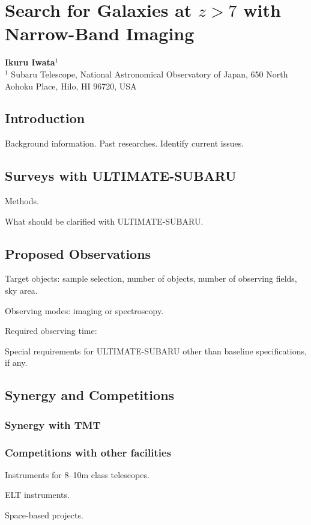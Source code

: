 \section{Search for Galaxies at $z>7$ with Narrow-Band Imaging
\label{sec:nbf}}

\noindent
{\bf Ikuru Iwata$^{1}$}\\
$^1$ Subaru Telescope, National Astronomical Observatory of Japan, 650
North Aohoku Place, Hilo, HI 96720, USA
\vspace{0.5cm}

\subsection{Introduction}

Background information. 
Past researches.
Identify current issues.

\subsection{Surveys with ULTIMATE-SUBARU}

Methods.

What should be clarified with ULTIMATE-SUBARU.

\subsection{Proposed Observations}

Target objects: sample selection, number of objects, number of observing
fields, sky area.

Observing modes: imaging or spectroscopy.

Required observing time:

Special requirements for ULTIMATE-SUBARU other than baseline
specifications, if any.

\subsection{Synergy and Competitions}

\subsubsection{Synergy with TMT}

\subsubsection{Competitions with other facilities}

Instruments for 8--10m class telescopes.

ELT instruments.

Space-based projects.
